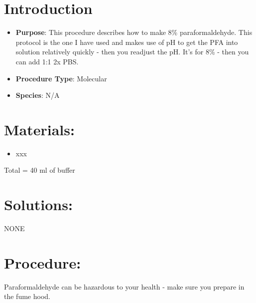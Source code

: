 \documentclass[
  letterpaper,
  DIV=11,
  numbers=noendperiod]{scrreprt}
\providecommand{\tightlist}{%
  \setlength{\itemsep}{0pt}\setlength{\parskip}{0pt}}\usepackage{longtable,booktabs,array}
\begin{document}
\hypertarget{introduction-14}{%
\section{Introduction}\label{introduction-14}}

\begin{itemize}
\tightlist
\item
  \textbf{Purpose}: This procedure describes how to make 8\%
  paraformaldehyde. This protocol is the one I have used and makes use
  of pH to get the PFA into solution relatively quickly - then you
  readjust the pH. It's for 8\% - then you can add 1:1 2x PBS.
\item
  \textbf{Procedure Type}: Molecular
\item
  \textbf{Species}: N/A
\end{itemize}

\hypertarget{materials-14}{%
\section{Materials:}\label{materials-14}}

\begin{itemize}
\tightlist
\item
  xxx
\end{itemize}

Total = 40 ml of buffer

\hypertarget{solutions-14}{%
\section{Solutions:}\label{solutions-14}}

NONE

\hypertarget{procedure-14}{%
\section{Procedure:}\label{procedure-14}}

\begin{tcolorbox}[enhanced jigsaw, toprule=.15mm, breakable, coltitle=black, leftrule=.75mm, title=\textcolor{quarto-callout-warning-color}{\faExclamationTriangle}\hspace{0.5em}{HUMAN HEALTH WARNGING}, bottomrule=.15mm, toptitle=1mm, bottomtitle=1mm, colframe=quarto-callout-warning-color-frame, opacityback=0, colback=white, opacitybacktitle=0.6, colbacktitle=quarto-callout-warning-color!10!white, rightrule=.15mm, titlerule=0mm, arc=.35mm, left=2mm]

Paraformaldehyde can be hazardous to your health - make sure you prepare
in the fume hood.

\end{tcolorbox}
\end{document}
